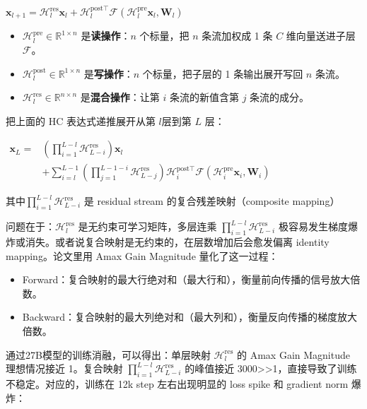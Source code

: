 \documentclass[zihao=false,fontset=windows]{ctexart}
\newcommand{\bigmath}[1]{%
  \begin{center}\large$\displaystyle #1$\end{center}%
}
\begin{document}
\bigmath{\mathbf x_{l+1}=\mathcal H_l^{\mathrm{res}}\mathbf x_l+\mathcal H_l^{\mathrm{post}\top}\mathcal F(\mathcal H_l^{\mathrm{pre}}\mathbf x_l,\mathbf W_l)}
\begin{itemize}
\item $\mathcal H_l^{\mathrm{pre}}\in\mathbb R^{1\times n}$ 是\textcolor{feishuRed}{\textbf{读操作}}：$n$ 个标量，把 $n$ 条流加权成 1 条 $C$ 维向量送进子层 $\mathcal F$。
\item $\mathcal H_l^{\mathrm{post}}\in\mathbb R^{1\times n}$ 是\textcolor{feishuRed}{\textbf{写操作}}：$n$ 个标量，把子层的 1 条输出展开写回 $n$ 条流。
\item $\mathcal H_l^{\mathrm{res}}\in\mathbb R^{n\times n}$ 是\textcolor{feishuRed}{\textbf{混合操作}}：让第 $i$ 条流的新值含第 $j$ 条流的成分。
\end{itemize}
把上面的 HC 表达式递推展开从第 $l$层到第 $L$ 层：

\bigmath{\begin{aligned}\mathbf x_L={}&\left(\prod_{i=1}^{L-l}\mathcal H_{L-i}^{\mathrm{res}}\right)\mathbf x_l\\&+\sum_{i=l}^{L-1}\left(\prod_{j=1}^{L-1-i}\mathcal H_{L-j}^{\mathrm{res}}\right)\mathcal H_i^{\mathrm{post}\top}\mathcal F(\mathcal H_i^{\mathrm{pre}}\mathbf x_i,\mathbf W_i)\end{aligned}}
其中$\prod_{i=1}^{L-l}\mathcal H_{L-i}^{\mathrm{res}}$ 是 residual stream 的复合残差映射（composite mapping）

\textcolor{feishuRed}{问题在于：}$\mathcal H_l^{\mathrm{res}}$\textcolor{feishuRed}{ 是无约束可学习矩阵，多层连乘 }$\prod_{i=1}^{L-l}\mathcal H_{L-i}^{\mathrm{res}}$\textcolor{feishuRed}{ 极容易发生梯度爆炸或消失。}或者说复合映射是无约束的，在层数增加后会愈发偏离 identity mapping。论文里用 Amax Gain Magnitude 量化了这一过程：

\begin{itemize}
\item Forward：复合映射的最大行绝对和（最大行和），衡量前向传播的信号放大倍数。
\item Backward：复合映射的最大列绝对和（最大列和），衡量反向传播的梯度放大倍数。
\end{itemize}
通过27B模型的训练消融，可以得出：单层映射 $\mathcal H_l^{\mathrm{res}}$ 的 Amax Gain Magnitude 理想情况接近 1。复合映射 $\prod_{i=1}^{L-l}\mathcal H_{L-i}^{\mathrm{res}}$ 的峰值接近 3000>>1，直接导致了训练不稳定。对应的，训练在 12k step 左右出现明显的 loss spike 和 gradient norm 爆炸：
\end{document}
